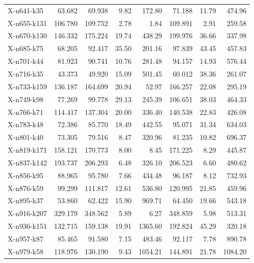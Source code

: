 \begin{longtable}{@{}lrrrrrrr@{}}
X-n641-k35   &     63.682 &      69.938 &   9.82 & 172.80 &      71.188 &  11.79 & 474.96 \\
X-n655-k131  &    106.780 &     109.752 &   2.78 &   1.84 &     109.891 &   2.91 & 259.58 \\
X-n670-k130  &    146.332 &     175.224 &  19.74 & 438.29 &     199.976 &  36.66 & 337.98 \\
X-n685-k75   &     68.205 &      92.417 &  35.50 & 201.16 &      97.839 &  43.45 & 457.83 \\
X-n701-k44   &     81.923 &      90.741 &  10.76 & 281.48 &      94.157 &  14.93 & 576.44 \\
X-n716-k35   &     43.373 &      49.920 &  15.09 & 501.45 &      60.012 &  38.36 & 261.07 \\
X-n733-k159  &    136.187 &     164.699 &  20.94 &  52.97 &     166.257 &  22.08 & 295.19 \\
X-n749-k98   &     77.269 &      99.778 &  29.13 & 245.39 &     106.651 &  38.03 & 464.33 \\
X-n766-k71   &    114.417 &     137.304 &  20.00 & 336.40 &     140.538 &  22.83 & 426.08 \\
X-n783-k48   &     72.386 &      85.770 &  18.49 & 442.55 &      95.071 &  31.34 & 634.03 \\
X-n801-k40   &     73.305 &      79.516 &   8.47 & 320.96 &      81.235 &  10.82 & 696.37 \\
X-n819-k171  &    158.121 &     170.773 &   8.00 &   8.45 &     171.225 &   8.29 & 445.87 \\
X-n837-k142  &    193.737 &     206.293 &   6.48 & 326.10 &     206.523 &   6.60 & 480.62 \\
X-n856-k95   &     88.965 &      95.780 &   7.66 & 434.48 &      96.187 &   8.12 & 732.93 \\
X-n876-k59   &     99.299 &     111.817 &  12.61 & 536.80 &     120.995 &  21.85 & 459.96 \\
X-n895-k37   &     53.860 &      62.422 &  15.90 & 969.71 &      64.450 &  19.66 & 543.18 \\
X-n916-k207  &    329.179 &     348.562 &   5.89 &   6.27 &     348.859 &   5.98 & 513.31 \\
X-n936-k151  &    132.715 &     159.138 &  19.91 & 1365.60 &     192.824 &  45.29 & 320.18 \\
X-n957-k87   &     85.465 &      91.580 &   7.15 & 483.46 &      92.117 &   7.78 & 890.78 \\
X-n979-k58   &    118.976 &     130.190 &   9.43 & 1054.21 &     144.891 &  21.78 & 1084.20 \\
\end{longtable}